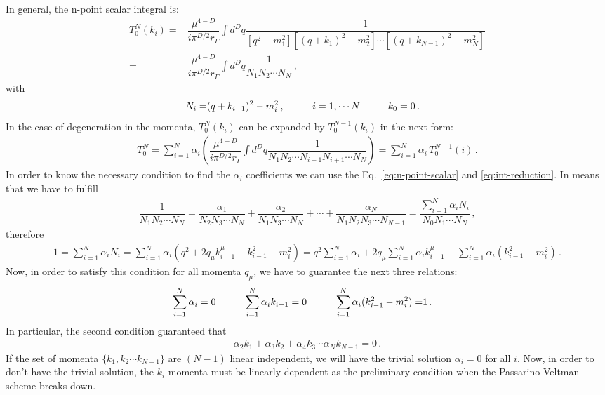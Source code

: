 In general, the n-point scalar integral is:
\begin{align}
\label{eq:n-point-scalar}
T^N_0(k_i)=&\dfrac{\mu^{4-D}}{i\pi^{D/2}r_{\Gamma}}\int d^Dq \dfrac{1}{[q^2-m_1^2][(q+k_1)^2-m_2^2]\cdots[(q+k_{N-1})^2-m_{N}^2]}\nonumber\\
=&\dfrac{\mu^{4-D}}{i\pi^{D/2}r_{\Gamma}}\int d^Dq \dfrac{1}{N_1N_2\cdots N_N}\,,
\end{align} 
with
\begin{align}
N_i=& (q+k_{i-1})^2-m_i^2 \,, \hspace{1 cm} i=1,\cdots N \hspace{1 cm} k_0=0\,.
\end{align}
In the case of degeneration in the momenta, $T^N_0(k_i)$ can be expanded by $T^{N-1}_0(k_i)$ in the next form:
%
\begin{align}
\label{eq:int-reduction}
T_0^N=\sum_{i=1}^{N}\alpha_i\left(\dfrac{\mu^{4-D}}{i\pi^{D/2}r_{\Gamma}}\int d^Dq \dfrac{1}{N_1N_2\cdots N_{i-1}N_{i+1}\cdots N_N}\right)
=\sum_{i=1}^{N}\alpha_i\,T_0^{N-1}(i)\,.
\end{align}
In order to know the necessary condition to find the $\alpha_i$ coefficients we can use the Eq.~\eqref{eq:n-point-scalar} and \eqref{eq:int-reduction}. In means that we  have to fulfill
\begin{align}
\dfrac{1}{N_1N_2\cdots N_N}= \dfrac{\alpha_1}{N_2N_3\cdots N_N}+\dfrac{\alpha_2}{N_1N_3\cdots N_N}+\cdots +\dfrac{\alpha_N}{N_1N_2N_3\cdots N_{N-1}}
=\dfrac{\sum_{i=1}^N\alpha_iN_i}{N_0N_1\cdots N_N}\,,
\end{align}
%
therefore
%
\begin{align}
1=\sum_{i=1}^N\alpha_iN_i=\sum_{i=1}^N\alpha_i(q^2+2q_{\mu}k_{i-1}^{\mu}+k_{i-1}^2-m_{i}^2)
=q^2\sum_{i=1}^N\alpha_i + 2q_{\mu}\sum_{i=1}^N\alpha_ik_{i-1}^{\mu} + \sum_{i=1}^N\alpha_i (k_{i-1}^2-m_i^2)\,.
\end{align}
%
Now, in order to satisfy this condition for all momenta $q_{\mu}$, we have to guarantee the next three relations:
\begin{align}
\sum_{i=1}^N\alpha_i = 0 \hspace{1 cm}
\sum_{i=1}^N\alpha_ik_{i-1} = 0  \hspace{1 cm}
\sum_{i=1}^N\alpha_i (k_{i-1}^2-m_i^2) =& 1\,.
\end{align}
In particular, the second condition guaranteed that
\begin{align}
\alpha_2k_1+\alpha_3k_2+\alpha_4k_3\cdots \alpha_{N}k_{N-1}=0\,.
\end{align}
%
If the set of momenta $\{k_1, k_2 \cdots k_{N-1}\}$ are $(N-1)$ linear independent, we will have the  trivial solution $\alpha_i=0$ for all $i$. Now, in order to don't have the trivial solution, the $k_i$ momenta must be linearly dependent as the preliminary condition when the Passarino-Veltman scheme breaks down.

